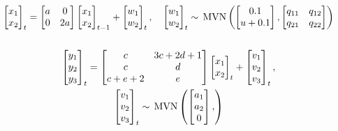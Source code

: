 \documentclass[]{article}
\def\MVN{\,\textup{\textrm{MVN}}}
\begin{document}
\begin{gather*}
\begin{bmatrix}x_1\\ x_2\end{bmatrix}_t
= \begin{bmatrix}a&0\\0&2a\end{bmatrix}
\begin{bmatrix}x_1\\x_2\end{bmatrix}_{t-1}
+ \begin{bmatrix}w_1\\ w_2\end{bmatrix}_t,\quad 
\begin{bmatrix}w_1\\ w_2\end{bmatrix}_t \sim \MVN\begin{pmatrix}\begin{bmatrix}0.1\\u+0.1\end{bmatrix},\begin{bmatrix}q_{11}&q_{12}\\q_{21}&q_{22}\end{bmatrix} \end{pmatrix}  \\
\\
\begin{bmatrix}y_1\\ y_2\\ y_3\end{bmatrix}_t
= \begin{bmatrix}c&3c+2d+1\\ c& d\\ c+e+2 &e\end{bmatrix}
\begin{bmatrix}x_1\\ x_2\end{bmatrix}_t
+ \begin{bmatrix}v_1\\ v_2\\ v_3\end{bmatrix}_t,\\
\begin{bmatrix}v_1\\ v_2\\ v_3\end{bmatrix}_t \sim \MVN\begin{pmatrix}\begin{bmatrix}a_1\\ a_2\\ 0\end{bmatrix},

\end{pmatrix}
\end{gather*}
\end{document}
